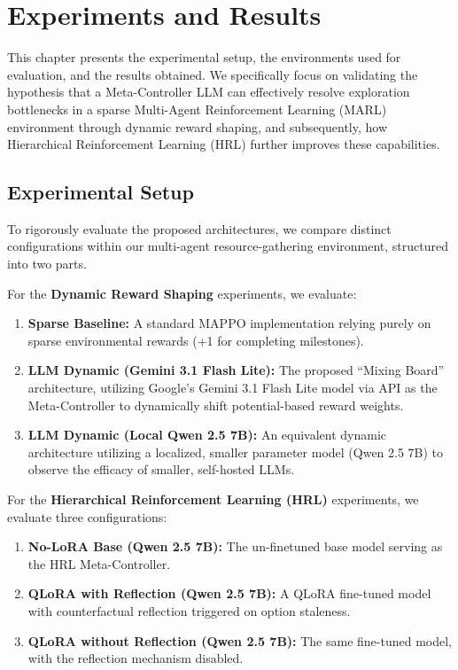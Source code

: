 \section{Experiments and Results}
\label{ch:experiments}

This chapter presents the experimental setup, the environments used for evaluation, and the results obtained. We specifically focus on validating the hypothesis that a Meta-Controller LLM can effectively resolve exploration bottlenecks in a sparse Multi-Agent Reinforcement Learning (MARL) environment through dynamic reward shaping, and subsequently, how Hierarchical Reinforcement Learning (HRL) further improves these capabilities.

\subsection{Experimental Setup}
\label{sec:exp_setup}

To rigorously evaluate the proposed architectures, we compare distinct configurations within our multi-agent resource-gathering environment, structured into two parts. 

For the \textbf{Dynamic Reward Shaping} experiments, we evaluate:
\begin{enumerate}
    \item \textbf{Sparse Baseline:} A standard MAPPO implementation relying purely on sparse environmental rewards (+1 for completing milestones).
    \item \textbf{LLM Dynamic (Gemini 3.1 Flash Lite):} The proposed ``Mixing Board'' architecture, utilizing Google's Gemini 3.1 Flash Lite model via API as the Meta-Controller to dynamically shift potential-based reward weights. 
    \item \textbf{LLM Dynamic (Local Qwen 2.5 7B):} An equivalent dynamic architecture utilizing a localized, smaller parameter model (Qwen 2.5 7B) to observe the efficacy of smaller, self-hosted LLMs. 
\end{enumerate}

For the \textbf{Hierarchical Reinforcement Learning (HRL)} experiments, we evaluate three configurations:
\begin{enumerate}
    \item \textbf{No-LoRA Base (Qwen 2.5 7B):} The un-finetuned base model serving as the HRL Meta-Controller.
    \item \textbf{QLoRA with Reflection (Qwen 2.5 7B):} A QLoRA fine-tuned model with counterfactual reflection triggered on option staleness.
    \item \textbf{QLoRA without Reflection (Qwen 2.5 7B):} The same fine-tuned model, with the reflection mechanism disabled.
\end{enumerate}

